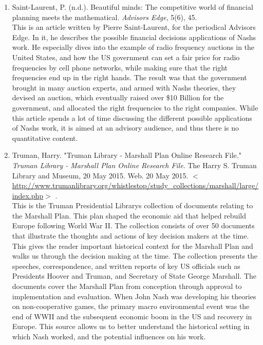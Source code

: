 \documentclass[11pt]{article}
\begin{document}
\begin{enumerate}
\item Saint-Laurent, P. (n.d.). Beautiful minds: The competitive world of financial planning meets the mathematical.\textit{ Advisor\textsc{}s Edge}, 5(6), 45.\\

This is an article written by Pierre Saint-Laurent, for the periodical Advisor\textsc{}s Edge. In it, he describes the possible financial decisions applications of Nash\textsc{}s work. He especially dives into the example of radio frequency auctions in the United States, and how the US government can set a fair price for radio frequencies by cell phone networks, while making sure that the right frequencies end up in the right hands. The result was that the government brought in many auction experts, and armed with Nash\textsc{}s theories, they devised an auction, which eventually raised over \$10 Billion for the government, and allocated the right frequencies to the right companies. While this article spends a lot of time discussing the different possible applications of Nash\textsc{}s work, it is aimed at an advisory audience, and thus there is no quantitative content.\\ 


\item Truman, Harry. "Truman Library - Marshall Plan Online Research File."  \textit{Truman Library - Marshall Plan Online Research File}. The Harry S. Truman Library and Museum, 20 May 2015. Web. 20 May 2015.  $<$ \url{http://www.trumanlibrary.org/whistlestop/study_collections/marshall/large/index.php}$>$ .\\

This is the Truman Presidential Library\textsc{}s collection of documents relating to the Marshall Plan. This plan shaped the economic aid that helped rebuild Europe following World War II. The collection consists of over 50 documents that illustrate the thoughts and actions of key decision makers at the time. This gives the reader important historical context for the Marshall Plan and walks us through the decision making at the time. The collection presents the speeches, correspondence, and written reports of key US officials such as Presidents Hoover and Truman, and Secretary of State George Marshall. The documents cover the Marshall Plan from conception through approval to implementation and evaluation. When John Nash was developing his theories on non-cooperative games, the primary macro environmental event was the end of WWII and the subsequent economic boom in the US and recovery in Europe. This source allows us to better understand the historical setting in which Nash worked, and the potential influences on his work.\\




\end{enumerate}
\end{document}
